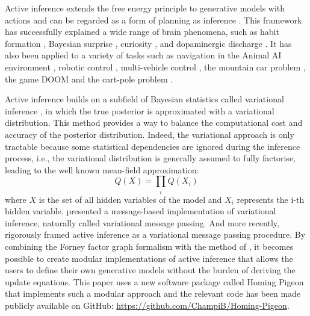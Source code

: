 \documentclass[twoside,11pt]{article}
\begin{document}
Active inference extends the free energy principle \citep{Friston2010,PITTI2020242} to generative models with actions \citep{FRISTON2016862,AI_TUTO,AI_VMP} and can be regarded as a form of planning as inference \citep{PAI}. This framework has successfully explained a wide range of brain phenomena, such as habit formation \citep{FRISTON2016862}, Bayesian surprise \citep{bayes_surprise}, curiosity \citep{curiosity}, and dopaminergic discharge \citep{dopamine}. It has also been applied to a variety of tasks such as navigation in the Animal AI environment \citep{DeepAIwithMCMC}, robotic control \citep{pezzato2020active,sancaktar2020endtoend,9457162}, multi-vehicle control \citep{BUTZ2019135}, the mountain car problem \citep{catal2020learning}, the game DOOM \citep{CULLEN2018809} and the cart-pole problem \citep{cart_pole}.

Active inference builds on a subfield of Bayesian statistics called variational inference \citep{VI_TUTO}, in which the true posterior is approximated with a variational distribution. This method provides a way to balance the computational cost and accuracy of the posterior distribution. Indeed, the variational approach is only tractable because some statistical dependencies are ignored during the inference process, i.e., the variational distribution is generally assumed to fully factorise, leading to the well known mean-field approximation:
$$Q(X) = \prod_{i} Q(X_i)$$
where $X$ is the set of all hidden variables of the model and $X_i$ represents the i-th hidden variable. \citet{VMP_TUTO} presented a message-based implementation of variational inference, naturally called variational message passing. And more recently, \citet{AI_VMP} rigorously framed active inference as a variational message passing procedure. By combining the Forney factor graph formalism \citep{FFG_TUTO} with the method of \citet{VMP_TUTO}, it becomes possible to create modular implementations of active inference \citep{Simul_AI,DBLP:journals/ijar/CoxLV19} that allows the users to define their own generative models without the burden of deriving the update equations. This paper uses a new software package called Homing Pigeon that implements such a modular approach and the relevant code has been made publicly available on GitHub: \url{https://github.com/ChampiB/Homing-Pigeon}.
\end{document}
